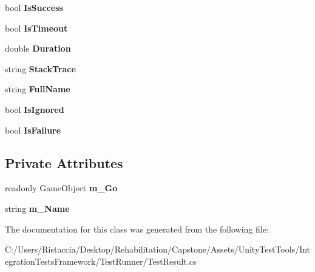 \begin{DoxyCompactItemize}
\mbox{\label{class_unity_test_1_1_test_result_ae6ed438e697e8396fb3b54797299d39e}} 
bool {\bfseries Is\+Success}
\item 
\mbox{\label{class_unity_test_1_1_test_result_a394e7ffee1d5d637ce3c0b0a23fd9167}} 
bool {\bfseries Is\+Timeout}
\item 
\mbox{\label{class_unity_test_1_1_test_result_a46cd83eecd2c2beec1559b503288fa70}} 
double {\bfseries Duration}
\item 
\mbox{\label{class_unity_test_1_1_test_result_aa94a1c0a7155a2f28d50f935e2598b21}} 
string {\bfseries Stack\+Trace}
\item 
\mbox{\label{class_unity_test_1_1_test_result_a77f4f0d7d3908d20c18e572db0aa412f}} 
string {\bfseries Full\+Name}
\item 
\mbox{\label{class_unity_test_1_1_test_result_aa9ea5f6726245c6f5511e0fe11a60d23}} 
bool {\bfseries Is\+Ignored}
\item 
\mbox{\label{class_unity_test_1_1_test_result_afa022561f03e3448b8b25791dab48a1b}} 
bool {\bfseries Is\+Failure}
\end{DoxyCompactItemize}
\subsection*{Private Attributes}
\begin{DoxyCompactItemize}
\item 
\mbox{\label{class_unity_test_1_1_test_result_a3aa398e8f87a3bed54d8aa99a0d74023}} 
readonly Game\+Object {\bfseries m\+\_\+\+Go}
\item 
\mbox{\label{class_unity_test_1_1_test_result_ac0d102670ab724db964003ae7a718f5c}} 
string {\bfseries m\+\_\+\+Name}
\end{DoxyCompactItemize}


The documentation for this class was generated from the following file\+:\begin{DoxyCompactItemize}
\item 
C\+:/\+Users/\+Ristaccia/\+Desktop/\+Rehabilitation/\+Capstone/\+Assets/\+Unity\+Test\+Tools/\+Integration\+Tests\+Framework/\+Test\+Runner/Test\+Result.\+cs\end{DoxyCompactItemize}
